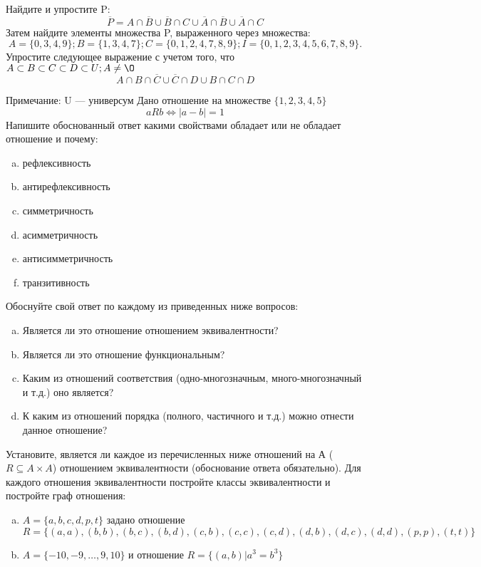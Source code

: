 \documentclass[10pt]{exam}
\begin{document}
\begin{questions}
\question
Найдите и упростите P:
\begin{equation*}
\overline{P} = A \cap \overline{B} \cup \overline{B} \cap C \cup \overline{A} \cap \overline{B} \cup \overline{A} \cap C
\end{equation*}
Затем найдите элементы множества P, выраженного через множества:
\begin{equation*}
A = \{0, 3, 4, 9\}; 
B = \{1, 3, 4, 7\};
C = \{0, 1, 2, 4, 7, 8, 9\};
I = \{0, 1, 2, 3, 4, 5, 6, 7, 8, 9\}.
\end{equation*}\question
Упростите следующее выражение с учетом того, что $A\subset B \subset C \subset D \subset U; A \neq \O$
\begin{equation*}
A \cap B  \cap \overline{C} \cup \overline{C} \cap D \cup B \cap C \cap D
\end{equation*}

Примечание: U — универсум\question
Дано отношение на множестве $\{1, 2, 3, 4, 5\}$ 
\begin{equation*}
aRb \iff |a-b| = 1
\end{equation*}
Напишите обоснованный ответ какими свойствами обладает или не обладает отношение и почему:   
\begin{enumerate} [a)]\setcounter{enumi}{0}
\item рефлексивность
\item антирефлексивность
\item симметричность
\item асимметричность
\item антисимметричность
\item транзитивность
\end{enumerate}

Обоснуйте свой ответ по каждому из приведенных ниже вопросов:
\begin{enumerate} [a)]\setcounter{enumi}{0}
    \item Является ли это отношение отношением эквивалентности?
    \item Является ли это отношение функциональным?
    \item Каким из отношений соответствия (одно-многозначным, много-многозначный и т.д.) оно является?
    \item К каким из отношений порядка (полного, частичного и т.д.) можно отнести данное отношение?
\end{enumerate}

\question
Установите, является ли каждое из перечисленных ниже отношений на А ($R \subseteq A \times A$) отношением эквивалентности (обоснование ответа обязательно). Для каждого отношения эквивалентности постройте классы 
эквивалентности и постройте граф отношения:
\begin{enumerate} [a)]\setcounter{enumi}{0}
\item $A = \{a, b, c, d, p, t\}$ задано отношение $R = \{(a, a), (b, b), (b, c), (b, d), (c, b), (c, c), (c, d), (d, b), (d, c), (d, d), (p,p), (t,t)\}$
\item $A = \{-10, -9, … , 9, 10\}$ и отношение $R = \{(a,b)|a^{3} = b^{3}\}$


\end{enumerate}
\end{questions}
\end{document}
